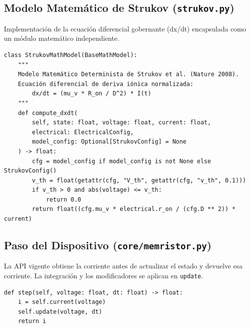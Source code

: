 \subsection{Modelo Matemático de Strukov (\texttt{strukov.py})}
Implementación de la ecuación diferencial gobernante (dx/dt) encapsulada como un módulo matemático independiente.

\begin{verbatim}
class StrukovMathModel(BaseMathModel):
    """
    Modelo Matemático Determinista de Strukov et al. (Nature 2008).
    Ecuación diferencial de deriva iónica normalizada:
        dx/dt = (mu_v * R_on / D^2) * I(t)
    """
    def compute_dxdt(
        self, state: float, voltage: float, current: float, 
        electrical: ElectricalConfig,
        model_config: Optional[StrukovConfig] = None
    ) -> float:
        cfg = model_config if model_config is not None else StrukovConfig()
        v_th = float(getattr(cfg, "V_th", getattr(cfg, "v_th", 0.1)))
        if v_th > 0 and abs(voltage) <= v_th:
            return 0.0
        return float((cfg.mu_v * electrical.r_on / (cfg.D ** 2)) * current)
\end{verbatim}

\subsection{Paso del Dispositivo (\texttt{core/memristor.py})}
La API vigente obtiene la corriente antes de actualizar el estado y devuelve esa corriente. La integración y los modificadores se aplican en \texttt{update}.

\begin{verbatim}
def step(self, voltage: float, dt: float) -> float:
    i = self.current(voltage)
    self.update(voltage, dt)
    return i
\end{verbatim}
